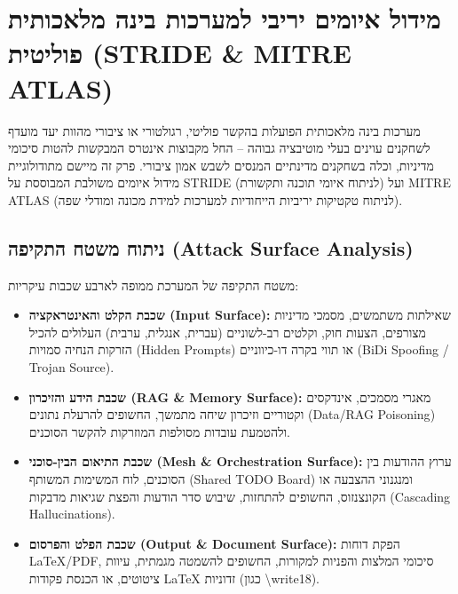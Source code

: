 
\section{מידול איומים יריבי למערכות בינה מלאכותית פוליטית (\textenglish{STRIDE \& MITRE ATLAS})}
\label{sec:adversarial-threat-modeling}

מערכות בינה מלאכותית הפועלות בהקשר פוליטי, רגולטורי או ציבורי מהוות יעד מועדף לשחקנים עוינים בעלי מוטיבציה גבוהה -- החל מקבוצות אינטרס המבקשות להטות סיכומי מדיניות, וכלה בשחקנים מדינתיים המנסים לשבש אמון ציבורי. פרק זה מיישם מתודולוגיית מידול איומים משולבת המבוססת על \textenglish{STRIDE} (לניתוח איומי תוכנה ותקשורת) ועל \textenglish{MITRE ATLAS} (לניתוח טקטיקות יריביות הייחודיות למערכות למידת מכונה ומודלי שפה).

\subsection{ניתוח משטח התקיפה (\textenglish{Attack Surface Analysis})}
משטח התקיפה של המערכת ממופה לארבע שכבות עיקריות:
\begin{itemize}
    \item \textbf{שכבת הקלט והאינטראקציה (\textenglish{Input Surface}):} שאילתות משתמשים, מסמכי מדיניות מצורפים, הצעות חוק, וקלטים רב-לשוניים (עברית, אנגלית, ערבית) העלולים להכיל הזרקות הנחיה סמויות (\textenglish{Hidden Prompts}) או תווי בקרה דו-כיווניים (\textenglish{BiDi Spoofing / Trojan Source}).
    \item \textbf{שכבת הידע והזיכרון (\textenglish{RAG \& Memory Surface}):} מאגרי מסמכים, אינדקסים וקטוריים וזיכרון שיחה מתמשך, החשופים להרעלת נתונים (\textenglish{Data/RAG Poisoning}) ולהטמעת עובדות מסולפות המוזרקות להקשר הסוכנים.
    \item \textbf{שכבת התיאום הבין-סוכני (\textenglish{Mesh \& Orchestration Surface}):} ערוץ ההודעות בין הסוכנים, לוח המשימות המשותף (\textenglish{Shared TODO Board}) ומנגנוני ההצבעה או הקונצנזוס, החשופים להתחזות, שיבוש סדר הודעות והפצת שגיאות מדבקות (\textenglish{Cascading Hallucinations}).
    \item \textbf{שכבת הפלט והפרסום (\textenglish{Output \& Document Surface}):} הפקת דוחות \textenglish{LaTeX/PDF}, סיכומי המלצות והפניות למקורות, החשופים להשמטה מגמתית, עיוות ציטוטים, או הכנסת פקודות \textenglish{LaTeX} זדוניות (כגון \textenglish{\textbackslash write18}).
\end{itemize}

